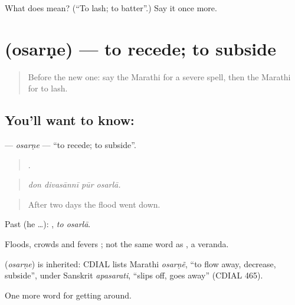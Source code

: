 \begin{tcolorbox}[breakable,colback=teal!4,colframe=teal!35!black,title={Before you move on}]
What does  mean? (\textquotedblleft{}To lash; to batter\textquotedblright{}.) Say it once more.
\end{tcolorbox}
\section[\texorpdfstring{\mr{ओसरणे} (osarṇe)}{ओसरणे (osarṇe)}]{ (osarṇe) — to recede; to subside}

\label{lesson:MR-C440-osarne}



\begin{quote}
Before the new one: say the Marathi for a severe spell, then the Marathi for to lash.
\end{quote}

\subsection*{You'll want to know: }
\textbf{} — \emph{osarṇe} — \textquotedblleft{}to recede; to subside\textquotedblright{}.

\begin{quote}
   .
\end{quote}

\begin{quote}
\emph{don divasānnī pūr osarlā.}
\end{quote}

\begin{quote}
After two days the flood went down.
\end{quote}

Past (he …):  , \emph{to osarlā}.

Floods, crowds and fevers ; not the same word as , a veranda.

\begin{cousinweb}
\textbf{} (\emph{osarṇe}) is inherited: CDIAL lists Marathi \emph{osarṇẽ}, \textquotedblleft{}to flow away, decrease, subside\textquotedblright{}, under Sanskrit \emph{apasarati}, \textquotedblleft{}slips off, goes away\textquotedblright{} (CDIAL 465).
\end{cousinweb}

\begin{grammarlens}[title={What you've built}]
One more word for getting around.
\end{grammarlens}

